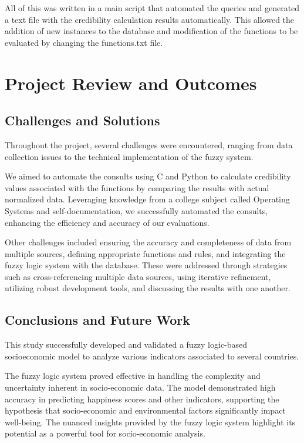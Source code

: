 \documentclass[fleqn,11pt]{article}
\begin{document}
All of this was written in a main script that automated the queries and generated a text file with the credibility calculation results automatically. This allowed the addition of new instances to the database and modification of the functions to be evaluated by changing the functions.txt file.

\newpage
\newpage
\section{Project Review and Outcomes}
\subsection{Challenges and Solutions}

Throughout the project, several challenges were encountered, ranging from data collection issues to the technical implementation of the fuzzy system.

We aimed to automate the consults using C and Python to calculate credibility values associated with the functions by comparing the results with actual normalized data. Leveraging knowledge from a college subject called Operating Systems and self-documentation, we successfully automated the consults, enhancing the efficiency and accuracy of our evaluations.

Other challenges included ensuring the accuracy and completeness of data from multiple sources,
defining appropriate functions and rules, and integrating the fuzzy logic system with the database. These were addressed through strategies such as cross-referencing multiple data sources, using iterative refinement, utilizing robust development tools, and discussing the results with one another.

\subsection{Conclusions and Future Work}

This study successfully developed and validated a fuzzy logic-based socioeconomic model to analyze various indicators associated to several countries. 

The fuzzy logic system proved effective in handling the complexity and uncertainty inherent in socio-economic data. The model demonstrated high accuracy in predicting happiness scores and other indicators, supporting the hypothesis that socio-economic and environmental factors significantly impact well-being. The nuanced insights provided by the fuzzy logic system highlight its potential as a powerful tool for socio-economic analysis.
\end{document}
